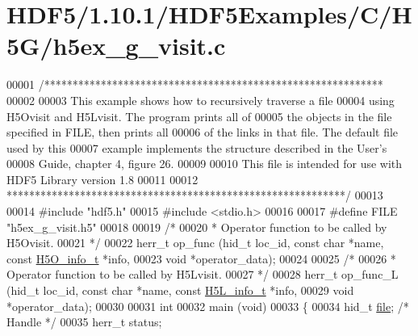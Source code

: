 \hypertarget{_h_d_f5_21_810_81_2_h_d_f5_examples_2_c_2_h5_g_2h5ex__g__visit_8c_source}{}\section{H\+D\+F5/1.10.1/\+H\+D\+F5\+Examples/\+C/\+H5\+G/h5ex\+\_\+g\+\_\+visit.c}
\label{_h_d_f5_21_810_81_2_h_d_f5_examples_2_c_2_h5_g_2h5ex__g__visit_8c_source}

\begin{DoxyCode}
00001 \textcolor{comment}{/************************************************************}
00002 \textcolor{comment}{}
00003 \textcolor{comment}{  This example shows how to recursively traverse a file}
00004 \textcolor{comment}{  using H5Ovisit and H5Lvisit.  The program prints all of}
00005 \textcolor{comment}{  the objects in the file specified in FILE, then prints all}
00006 \textcolor{comment}{  of the links in that file.  The default file used by this}
00007 \textcolor{comment}{  example implements the structure described in the User's}
00008 \textcolor{comment}{  Guide, chapter 4, figure 26.}
00009 \textcolor{comment}{}
00010 \textcolor{comment}{  This file is intended for use with HDF5 Library version 1.8}
00011 \textcolor{comment}{}
00012 \textcolor{comment}{ ************************************************************/}
00013 
00014 \textcolor{preprocessor}{#include "hdf5.h"}
00015 \textcolor{preprocessor}{#include <stdio.h>}
00016 
00017 \textcolor{preprocessor}{#define FILE       "h5ex\_g\_visit.h5"}
00018 
00019 \textcolor{comment}{/*}
00020 \textcolor{comment}{ * Operator function to be called by H5Ovisit.}
00021 \textcolor{comment}{ */}
00022 herr\_t op\_func (hid\_t loc\_id, \textcolor{keyword}{const} \textcolor{keywordtype}{char} *name, \textcolor{keyword}{const} \hyperlink{struct_h5_o__info__t}{H5O\_info\_t} *info,
00023             \textcolor{keywordtype}{void} *operator\_data);
00024 
00025 \textcolor{comment}{/*}
00026 \textcolor{comment}{ * Operator function to be called by H5Lvisit.}
00027 \textcolor{comment}{ */}
00028 herr\_t op\_func\_L (hid\_t loc\_id, \textcolor{keyword}{const} \textcolor{keywordtype}{char} *name, \textcolor{keyword}{const} \hyperlink{struct_h5_l__info__t}{H5L\_info\_t} *info,
00029             \textcolor{keywordtype}{void} *operator\_data);
00030 
00031 \textcolor{keywordtype}{int}
00032 main (\textcolor{keywordtype}{void})
00033 \{
00034     hid\_t           \hyperlink{structfile}{file};           \textcolor{comment}{/* Handle */}
00035     herr\_t          status;

\end{DoxyCode}
